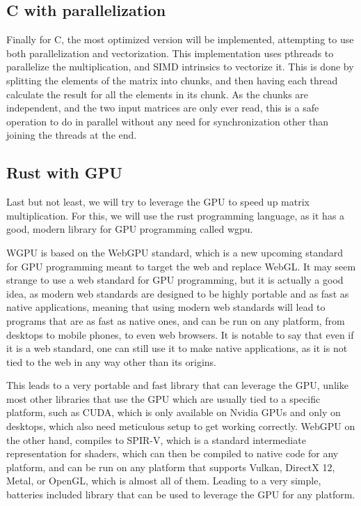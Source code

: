 \documentclass{article}
\begin{document}
\subsection{C with parallelization}

Finally for C, the most optimized version will be implemented, attempting to use both parallelization and vectorization.
This implementation uses pthreads to parallelize the multiplication, and SIMD intrinsics to vectorize it.
This is done by splitting the elements of the matrix into chunks, and then having each thread calculate the result for all the elements in its chunk.
As the chunks are independent, and the two input matrices are only ever read, this is a safe operation to do in parallel without any need for synchronization other than joining
the threads at the end.

\subsection{Rust with GPU}

Last but not least, we will try to leverage the GPU to speed up matrix multiplication.
For this, we will use the rust programming language, as it has a good, modern library for GPU programming called wgpu.

WGPU is based on the WebGPU standard, which is a new upcoming standard for GPU programming meant to target the web and replace WebGL.
It may seem strange to use a web standard for GPU programming, but it is actually a good idea, as modern web standards are designed to be
highly portable and as fast as native applications, meaning that using modern web standards will lead to programs that are as fast as native ones,
and can be run on any platform, from desktops to mobile phones, to even web browsers.
It is notable to say that even if it is a web standard, one can still use it to make native applications, as it is not tied to the web in any way
other than its origins.

This leads to a very portable and fast library that can leverage the GPU, unlike most other libraries that use the GPU which
are usually tied to a specific platform, such as CUDA, which is only available on Nvidia GPUs and only on desktops, which also need meticulous setup
to get working correctly. WebGPU on the other hand, compiles to SPIR-V, which is a standard intermediate representation for shaders, which can then be
compiled to native code for any platform, and can be run on any platform that supports Vulkan, DirectX 12, Metal, or OpenGL, which is almost all of them.
Leading to a very simple, batteries included library that can be used to leverage the GPU for any platform.
\end{document}
